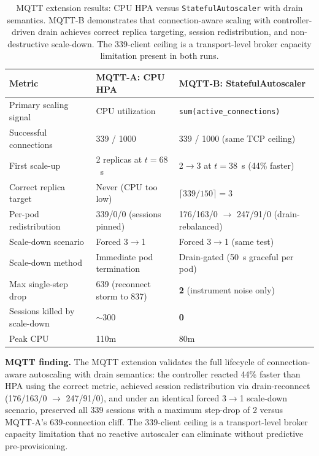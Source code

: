 \documentclass[twocolumn]{svjour3}
\begin{document}
\begin{table}[t]
\centering
\caption{MQTT extension results: CPU HPA versus \texttt{StatefulAutoscaler} with drain semantics. MQTT-B demonstrates that connection-aware scaling with controller-driven drain achieves correct replica targeting, session redistribution, and non-destructive scale-down. The 339-client ceiling is a transport-level broker capacity limitation present in both runs.}
\label{tab:mqtt_results}
\begin{tabular}{@{}p{4.2cm}p{4.8cm}p{4.8cm}@{}}
\toprule
\rowcolor{gray!12}
\textbf{Metric} & \textbf{MQTT-A: CPU HPA} & \textbf{MQTT-B: StatefulAutoscaler} \\
\midrule
Primary scaling signal & CPU utilization & \texttt{sum(active\_connections)} \\
Successful connections & 339 / 1000 & 339 / 1000 (same TCP ceiling) \\
First scale-up & 2 replicas at $t=68$~s & 2$\rightarrow$3 at $t=38$~s (44\% faster) \\
Correct replica target & Never (CPU too low) & $\lceil 339/150 \rceil = 3$ \\
Per-pod redistribution & 339/0/0 (sessions pinned) & 176/163/0 $\rightarrow$ 247/91/0 (drain-rebalanced) \\
Scale-down scenario & Forced 3$\rightarrow$1 & Forced 3$\rightarrow$1 (same test) \\
Scale-down method & Immediate pod termination & Drain-gated (50~s graceful per pod) \\
Max single-step drop & 639 (reconnect storm to 837) & \textbf{2} (instrument noise only) \\
Sessions killed by scale-down & $\sim$300 & \textbf{0} \\
Peak CPU & 110m & 80m \\
\bottomrule
\end{tabular}
\end{table}

\begin{keyresult}
\noindent\textbf{MQTT finding.} The MQTT extension validates the full lifecycle of connection-aware autoscaling with drain semantics: the controller reacted 44\% faster than HPA using the correct metric, achieved session redistribution via drain-reconnect (176/163/0 $\rightarrow$ 247/91/0), and under an identical forced 3$\rightarrow$1 scale-down scenario, preserved all 339 sessions with a maximum step-drop of 2 versus MQTT-A's 639-connection cliff. The 339-client ceiling is a transport-level broker capacity limitation that no reactive autoscaler can eliminate without predictive pre-provisioning.
\end{keyresult}
\end{document}
